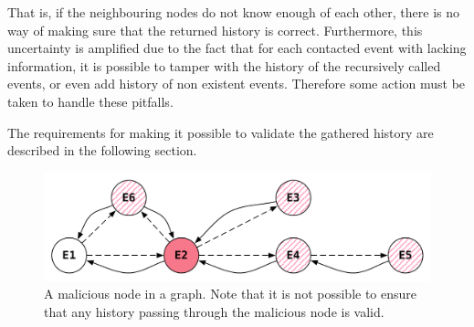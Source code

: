 	\newpar That is, if the neighbouring nodes do not know enough of each other, there is no way of making sure that the returned history is correct. Furthermore, this uncertainty is amplified due to the fact that for each contacted event with lacking information, it is possible to tamper with the history of the recursively called events, or even add history of non existent events. Therefore some action must be taken to handle these pitfalls.
	
	The requirements for making it possible to validate the gathered history are described in the following section. 
	
	\begin{figure}[H]
		\centering
		\includegraphics[width=\textwidth]{4connect/images/recursive-evil-node.pdf}
		\caption{A malicious node in a graph. Note that it is not possible to ensure that any history passing through the malicious node is valid.}
		\label{fig:connecting:recursive-evil-node}
	\end{figure}
